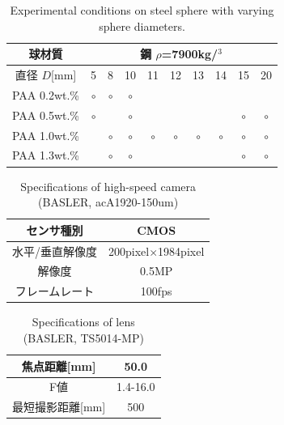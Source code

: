 \begin{table}[h]
    \centering
    \caption{Experimental conditions on steel sphere with varying sphere diameters.}
    \label{table:exp-conditions-dia}
    \begin{tabular}{c|c|c|c|c|c|c|c|c|c}\hline
        球材質       & \multicolumn{9}{|c}{鋼 $\rho$=7900kg/$^3$}                                                                                 \\ \hline
        直径 $D$[mm] & 5                                          & 8       & 10      & 11      & 12      & 13      & 14      & 15      & 20      \\ \hline \hline
        PAA 0.2wt.\% & $\circ$                                    & $\circ$ & $\circ$ &         &         &         &         &         &         \\ \hline
        PAA 0.5wt.\% & $\circ$                                    &         & $\circ$ &         &         &         &         & $\circ$ & $\circ$ \\ \hline
        PAA 1.0wt.\% &                                            & $\circ$ & $\circ$ & $\circ$ & $\circ$ & $\circ$ & $\circ$ & $\circ$ & $\circ$ \\ \hline
        PAA 1.3wt.\% &                                            & $\circ$ & $\circ$ &         &         &         &         & $\circ$ & $\circ$ \\ \hline
    \end{tabular}
\end{table}

\begin{table}[h]
    \centering
    \caption{Specifications of high-speed camera (BASLER, acA1920-150um)}
    \label{table:camera}
    \begin{tabular}{c|c}\hline
        センサ種別      & CMOS                      \\ \hline
        水平/垂直解像度 & 200pixel$\times$1984pixel \\ \hline
        解像度          & 0.5MP                     \\ \hline
        フレームレート  & 100fps                    \\ \hline
    \end{tabular}
\end{table}

\begin{table}[ht]
    \centering
    \caption{Specifications of lens (BASLER, TS5014-MP)}
    \label{table:lens}
    \begin{tabular}{c|c}\hline
        焦点距離[mm]     & 50.0     \\ \hline
        F値              & 1.4-16.0 \\ \hline
        最短撮影距離[mm] & 500      \\ \hline
    \end{tabular}
\end{table}

